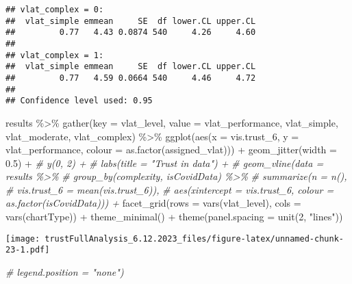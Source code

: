 \documentclass[
]{article}
\newenvironment{Shaded}{\begin{snugshade}}{\end{snugshade}}
\newcommand{\AttributeTok}[1]{\textcolor[rgb]{0.77,0.63,0.00}{#1}}
\newcommand{\CommentTok}[1]{\textcolor[rgb]{0.56,0.35,0.01}{\textit{#1}}}
\newcommand{\DecValTok}[1]{\textcolor[rgb]{0.00,0.00,0.81}{#1}}
\newcommand{\FloatTok}[1]{\textcolor[rgb]{0.00,0.00,0.81}{#1}}
\newcommand{\FunctionTok}[1]{\textcolor[rgb]{0.00,0.00,0.00}{#1}}
\newcommand{\NormalTok}[1]{#1}
\newcommand{\SpecialCharTok}[1]{\textcolor[rgb]{0.00,0.00,0.00}{#1}}
\newcommand{\StringTok}[1]{\textcolor[rgb]{0.31,0.60,0.02}{#1}}
\begin{document}
\begin{verbatim}
## vlat_complex = 0:
##  vlat_simple emmean     SE  df lower.CL upper.CL
##         0.77   4.43 0.0874 540     4.26     4.60
## 
## vlat_complex = 1:
##  vlat_simple emmean     SE  df lower.CL upper.CL
##         0.77   4.59 0.0664 540     4.46     4.72
## 
## Confidence level used: 0.95
\end{verbatim}

\begin{Shaded}
\begin{Highlighting}[]
\NormalTok{results }\SpecialCharTok{\%\textgreater{}\%}
  \FunctionTok{gather}\NormalTok{(}\AttributeTok{key =}\NormalTok{ vlat\_level, }\AttributeTok{value =}\NormalTok{ vlat\_performance, vlat\_simple,  vlat\_moderate, vlat\_complex) }\SpecialCharTok{\%\textgreater{}\%}
  \FunctionTok{ggplot}\NormalTok{(}\FunctionTok{aes}\NormalTok{(}\AttributeTok{x =}\NormalTok{ vis.trust\_6, }\AttributeTok{y =}\NormalTok{ vlat\_performance, }\AttributeTok{colour =} \FunctionTok{as.factor}\NormalTok{(assigned\_vlat))) }\SpecialCharTok{+}
  \FunctionTok{geom\_jitter}\NormalTok{(}\AttributeTok{width =} \FloatTok{0.5}\NormalTok{) }\SpecialCharTok{+}
  \CommentTok{\# y(0, 2) + }
  \CommentTok{\# labs(title = "Trust in data") + }
  \CommentTok{\# geom\_vline(data = results \%\textgreater{}\% }
  \CommentTok{\#              group\_by(complexity, isCovidData) \%\textgreater{}\%}
  \CommentTok{\#              summarize(n = n(), }
  \CommentTok{\#                        vis.trust\_6 = mean(vis.trust\_6)), }
  \CommentTok{\#            aes(xintercept = vis.trust\_6, colour = as.factor(isCovidData))) +}
  \FunctionTok{facet\_grid}\NormalTok{(}\AttributeTok{rows =} \FunctionTok{vars}\NormalTok{(vlat\_level), }\AttributeTok{cols =} \FunctionTok{vars}\NormalTok{(chartType)) }\SpecialCharTok{+}
  \FunctionTok{theme\_minimal}\NormalTok{() }\SpecialCharTok{+} 
  \FunctionTok{theme}\NormalTok{(}\AttributeTok{panel.spacing =} \FunctionTok{unit}\NormalTok{(}\DecValTok{2}\NormalTok{, }\StringTok{"lines"}\NormalTok{))}
\end{Highlighting}
\end{Shaded}

\texttt{[image: trustFullAnalysis\_6.12.2023\_files/figure-latex/unnamed-chunk-23-1.pdf]}

\begin{Shaded}
\begin{Highlighting}[]
        \CommentTok{\# legend.position = "none")}
\end{Highlighting}
\end{Shaded}
\end{document}
